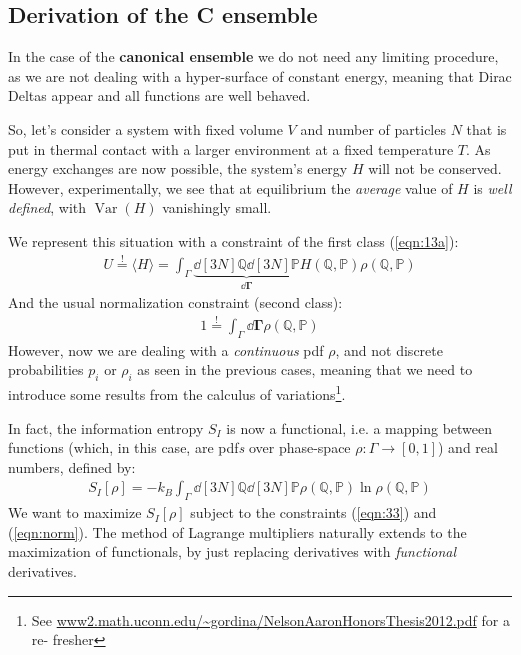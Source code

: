 \documentclass[../../main.tex]{subfiles}
\begin{document}

\subsection{Derivation of the C ensemble}
In the case of the \textbf{canonical ensemble} we do not need any limiting procedure, as we are not dealing with a  hyper-surface of constant energy, meaning that Dirac Deltas appear and all functions are well behaved.

\medskip

So, let's consider a system with fixed volume $V$ and number of particles $N$ that is put in thermal contact with a larger environment at a fixed temperature $T$. As energy exchanges are now possible, the system's energy $H$ will not be conserved. However, experimentally, we see that at equilibrium the \textit{average} value of $H$ is \textit{well defined}, with $\operatorname{Var}(H)$ vanishingly small. 

\medskip

We represent this situation with a constraint of the first class (\ref{eqn:13a}):
\begin{align} \label{eqn:33}
    U \overset{!}{=}  \langle H \rangle = \int_\Gamma \underbrace{\dd[3N]{\mathbb{Q}} \dd[3N]{\mathbb{P}}}_{\dd{\bm{\Gamma}}}  H(\mathbb{Q}, \mathbb{P}) \rho(\mathbb{Q}, \mathbb{P})
\end{align}
And the usual normalization constraint (second class):
\begin{align}\label{eqn:norm}
    1 \overset{!}{=} \int_{\Gamma} \dd{\bm{\Gamma}} \rho(\mathbb{Q}, \mathbb{P})
\end{align}
However, now we are dealing with a \textit{continuous} pdf $\rho$, and not discrete probabilities $p_i$ or $\rho_i$ as seen in the previous cases, meaning that we need to introduce some results from the calculus of variations\footnote{See \url{www2.math.uconn.edu/~gordina/NelsonAaronHonorsThesis2012.pdf} for a re-
fresher}.

\medskip

In fact, the information entropy $S_I$ is now a functional, i.e. a mapping between functions (which, in this case, are pdf\textit{s} over phase-space $\rho \colon \Gamma \to [0,1]$) and real numbers, defined by:
\begin{align}
    S_I[\rho] = -k_B \int_{\Gamma} \dd[3N]{\mathbb{Q}} \dd[3N]{\mathbb{P}} \rho(\mathbb{Q}, \mathbb{P}) \ln \rho(\mathbb{Q}, \mathbb{P})
\end{align}
We want to maximize $S_I[\rho]$ subject to the constraints (\ref{eqn:33}) and (\ref{eqn:norm}). The method of Lagrange multipliers naturally extends to the maximization of functionals, by just replacing derivatives with \textit{functional} derivatives.
\end{document}
